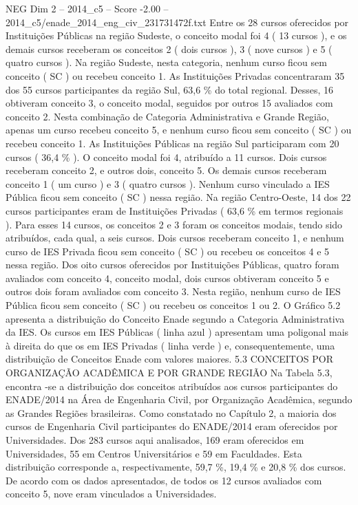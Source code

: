 \begin{textsample}{NEG Dim 2 – 2014\_c5 – Score -2.00 – 2014\_c5/enade\_2014\_eng\_civ\_231731472f.txt}
Entre os 28 cursos oferecidos por Instituições Públicas na região Sudeste, o conceito modal foi 4 ( 13 cursos ), e os demais cursos receberam os conceitos 2 ( dois cursos ), 3 ( nove cursos ) e 5 ( quatro cursos ).
Na região Sudeste, nesta categoria, nenhum curso ficou sem conceito ( SC ) ou recebeu conceito 1.
As Instituições Privadas concentraram 35 dos 55 cursos participantes da região Sul, 63,6 \% do total regional.
Desses, 16 obtiveram conceito 3, o conceito modal, seguidos por outros 15 avaliados com conceito 2.
Nesta combinação de Categoria Administrativa e Grande Região, apenas um curso recebeu conceito 5, e nenhum curso ficou sem conceito ( SC ) ou recebeu conceito 1.
As Instituições Públicas na região Sul participaram com 20 cursos ( 36,4 \% ).
O conceito modal foi 4, atribuído a 11 cursos.
Dois cursos receberam conceito 2, e outros dois, conceito 5.
Os demais cursos receberam conceito 1 ( um curso ) e 3 ( quatro cursos ).
Nenhum curso vinculado a IES Pública ficou sem conceito ( SC ) nessa região.
Na região Centro-Oeste, 14 dos 22 cursos participantes eram de Instituições Privadas ( 63,6 \% em termos regionais ).
Para esses 14 cursos, os conceitos 2 e 3 foram os conceitos modais, tendo sido atribuídos, cada qual, a seis cursos.
Dois cursos receberam conceito 1, e nenhum curso de IES Privada ficou sem conceito ( SC ) ou recebeu os conceitos 4 e 5 nessa região.
Dos oito cursos oferecidos por Instituições Públicas, quatro foram avaliados com conceito 4, conceito modal, dois cursos obtiveram conceito 5 e outros dois foram avaliados com conceito 3.
Nesta região, nenhum curso de IES Pública ficou sem conceito ( SC ) ou recebeu os conceitos 1 ou 2.
O Gráfico 5.2 apresenta a distribuição do Conceito Enade segundo a Categoria Administrativa da IES.
Os cursos em IES Públicas ( linha azul ) apresentam uma poligonal mais à direita do que os em IES Privadas ( linha verde ) e, consequentemente, uma distribuição de Conceitos Enade com valores maiores. 5.3 CONCEITOS POR ORGANIZAÇÃO ACADÊMICA E POR GRANDE REGIÃO Na Tabela 5.3, encontra -se a distribuição dos conceitos atribuídos aos cursos participantes do ENADE/2014 na Área de Engenharia Civil, por Organização Acadêmica, segundo as Grandes Regiões brasileiras.
Como constatado no Capítulo 2, a maioria dos cursos de Engenharia Civil participantes do ENADE/2014 eram oferecidos por Universidades.
Dos 283 cursos aqui analisados, 169 eram oferecidos em Universidades, 55 em Centros Universitários e 59 em Faculdades.
Esta distribuição corresponde a, respectivamente, 59,7 \%, 19,4 \% e 20,8 \% dos cursos.
De acordo com os dados apresentados, de todos os 12 cursos avaliados com conceito 5, nove eram vinculados a Universidades.

\end{textsample}
